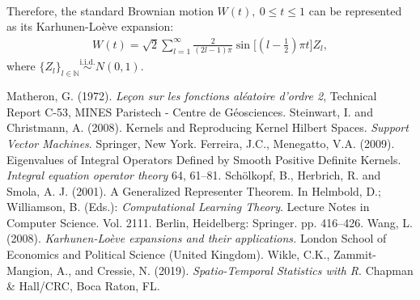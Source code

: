 \documentclass{article}
\begin{document}
\paragraph{} Therefore, the standard Brownian motion $W(t),\ 0\leq t\leq 1$ can be represented as its Karhunen-Loève expansion:
\begin{align*}
	W(t) = \sqrt{2}\sum_{l=1}^\infty \frac{2}{(2l-1)\pi}\sin\bigl[(l - \frac{1}{2})\pi t\bigl]Z_l,\tag{7.43}
\end{align*}
where $\{Z_l\}_{l\in\mathbb{N}}\overset{\mathrm{i.i.d.}}{\sim} N(0,1).$

\newpage

\begin{thebibliography}{99}  
 Matheron, G. (1972). \textit{Leçon sur les fonctions aléatoire d’ordre 2}, Technical Report C-53, MINES Paristech - Centre de Géosciences.
 Steinwart, I. and Christmann, A. (2008). Kernels and Reproducing Kernel Hilbert Spaces.
\textit{Support Vector Machines}. Springer, New York.
 Ferreira, J.C., Menegatto, V.A. (2009). Eigenvalues of Integral Operators Defined by Smooth Positive Definite Kernels. \textit{Integral equation operator theory} 64, 61–81.
 Schölkopf, B., Herbrich, R. and Smola, A. J. (2001). A Generalized Representer Theorem. In Helmbold, D.; Williamson, B. (Eds.): \textit{Computational Learning Theory}. Lecture Notes in Computer Science. Vol. 2111. Berlin, Heidelberg: Springer. pp. 416–426.
 Wang, L. (2008). \textit{Karhunen-Loève expansions and their applications.} London School of Economics and Political Science (United Kingdom).
 Wikle, C.K., Zammit-Mangion, A., and Cressie, N. (2019). \textit{Spatio-Temporal Statistics with R}. Chapman \& Hall/CRC, Boca Raton, FL.
\end{thebibliography}
\end{document}
